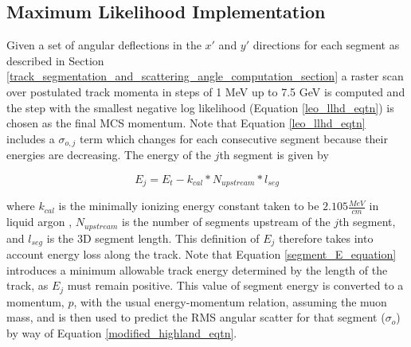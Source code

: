 \documentclass[a4paper,11pt]{article}
\begin{document}
\subsection{Maximum Likelihood Implementation}\label{maximum_likelihood_section}

Given a set of angular deflections in the $x'$ and $y'$ directions for each segment as described in Section \ref{track_segmentation_and_scattering_angle_computation_section} a raster scan over postulated track momenta in steps of 1 MeV up to 7.5 GeV is computed and the step with the smallest negative log likelihood (Equation \ref{leo_llhd_eqtn}) is chosen as the final MCS momentum. Note that Equation \ref{leo_llhd_eqtn} includes a $\sigma_{o,j}$ term which changes for each consecutive segment because their energies are decreasing. The energy of the $j$th segment is given by

\begin{equation}\label{segment_E_equation}
E_{j} = E_t - k_{cal}*N_{upstream}*l_{seg}
\end{equation}

where $k_{cal}$ is the minimally ionizing energy constant taken to be $2.105 \frac{MeV}{cm}$ in liquid argon \cite{MIPenergysource}, $N_{upstream}$ is the number of segments upstream of the $j$th segment, and $l_{seg}$ is the 3D segment length. This definition of $E_j$ therefore takes into account energy loss along the track. Note that Equation \ref{segment_E_equation} introduces a minimum allowable track energy determined by the length of the track, as $E_{j}$ must remain positive. This value of segment energy is converted to a momentum, $p$, with the usual energy-momentum relation, assuming the muon mass, and is then used to predict the RMS angular scatter for that segment ($\sigma_o$) by way of Equation \ref{modified_highland_eqtn}. 
\end{document}
